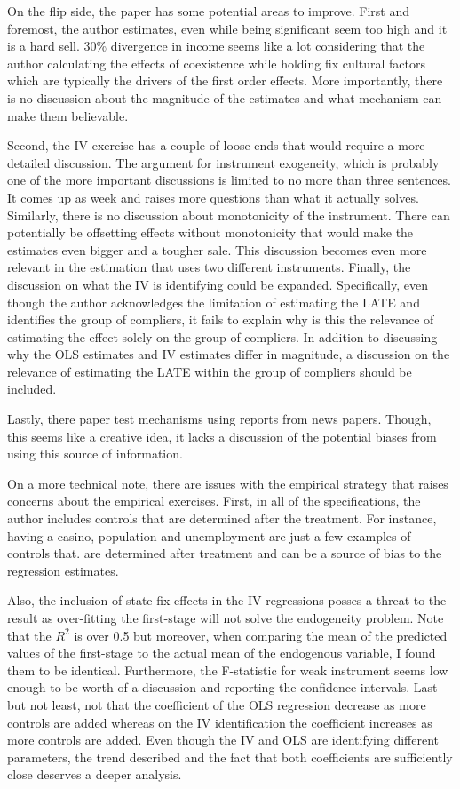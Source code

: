 \documentclass[12pt]{article}
\begin{document}
On the flip side, the paper has some potential areas to improve. First and foremost, the author estimates, even while being significant seem too high and it is a hard sell. 30\% divergence in income seems like a lot considering that the author calculating the effects of coexistence while holding fix cultural factors which are typically the drivers of the first order effects. More importantly, there is no discussion about the magnitude of the estimates and what mechanism can make them believable. 

Second, the IV exercise has a couple of loose ends that would require a more detailed discussion. The argument for instrument exogeneity, which is probably one of the more important discussions is limited to no more than three sentences. It comes up as week and raises more questions than what it actually solves. Similarly, there is no discussion about monotonicity of the instrument. There can potentially be offsetting effects without monotonicity that would make the estimates even bigger and a tougher sale. This discussion becomes even more relevant in the estimation that uses two different instruments. Finally, the discussion on what the IV is identifying could be expanded. Specifically, even though the author acknowledges the limitation of estimating the LATE and identifies the group of compliers, it fails to explain why is this the relevance of estimating the effect solely on the group of compliers. In addition to discussing why the OLS estimates and IV estimates differ in magnitude, a discussion on the relevance of estimating the LATE within the group  of compliers should be included. 

Lastly, there paper test mechanisms using reports from news papers. Though, this seems like a creative idea, it lacks a discussion of the potential biases from using this source of information. 

On a more technical note, there are issues with the empirical strategy that raises concerns about the empirical exercises. First, in all of the specifications, the author includes controls that are determined after the treatment. For instance, having a casino, population and unemployment are just a few examples of controls that. are determined after treatment and can be a source of bias to the regression estimates.  

Also, the inclusion of state fix effects in the IV regressions posses a threat to the result as over-fitting the first-stage will not solve the endogeneity problem. Note that the $R^2$ is over 0.5 but moreover, when comparing the mean of the predicted values of the first-stage to the actual mean of the endogenous variable, I found them to be identical. Furthermore, the F-statistic for weak instrument seems low enough to be worth of a discussion and reporting the confidence intervals. Last but not least, not that the coefficient of the OLS regression decrease as more controls are added whereas on the IV identification the coefficient increases as more controls are added. Even though the IV and OLS are identifying different parameters, the trend described and the fact that both coefficients are sufficiently close deserves a deeper analysis. 
\end{document}
